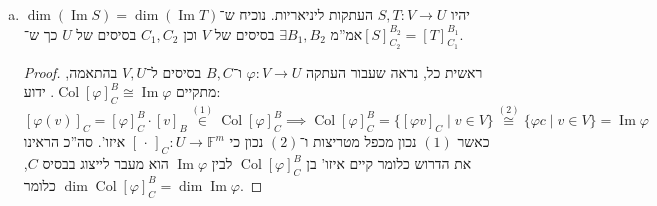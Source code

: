 \documentclass[]{article}
\newcommand\vphi  {\varphi}
\DeclareMathOperator\Img   {Im}
\DeclareMathOperator{\col}    {Col}
\newcommand\F         {\mathbb{F}}
\newcommand\co        {\colon}
\theoremstyle{definition}
\begin{document}
\begin{enumerate}[(a)]
\begin{proof}
\begin{enumerate}
            \end{enumerate}
        \end{proof}
        
        \item יהיו $S, T \co V \to U$ העתקות ליניאריות. נוכיח ש־$\dim(\Img S) = \dim (\Img T)$ אמ''מ $\exists B_1, B_2$ בסיסים של $V$ וכן $C_1, C_2$ בסיסים של $U$ כך ש־$[S]^{B_2}_{C_2} = [T]^{B_1}_{C_1}$. \begin{proof}
            ראשית כל, נראה שעבור העתקה $\vphi \co V \to U$ ו־$B, C$ בסיסים ל־$V, U$ בהתאמה, מתקיים $\col [\vphi]^B_C \cong \Img \vphi$. ידוע: 
            \[ [\vphi(v)]_C = [\vphi]_C^B \cdot [v]_B \overset{(1)}{\in} \col [\vphi]_C^B \implies \col[\vphi]^B_C = \{[\vphi v]_C \mid v \in V\} \overset{(2)}{\cong} \{\vphi c \mid v \in V\} = \Img \vphi \]
            כאשר $(1)$ נכון מכפל מטריצות ו־$(2)$ נכון כי $[\, \cdot \,]_C \co U \to \F^m$ איזו'. סה''כ הראינו את הדרוש כלומר קיים איזו' בן $\col[\vphi]_C^B$ לבין $\Img \vphi$ הוא מעבר לייצוג בבסיס $C$, כלומר $\dim \col[\vphi]^B_C = \dim \Img \vphi$. 
            

\end{proof}
\end{enumerate}
\end{document}

